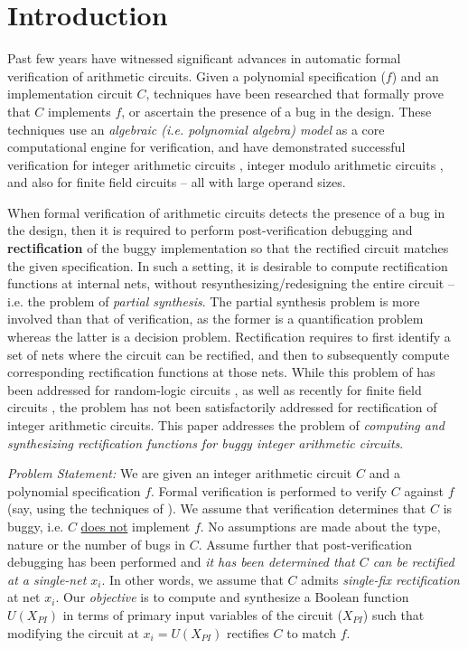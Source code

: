 \section{Introduction}

Past few years have witnessed significant advances in automatic
formal verification of arithmetic circuits. Given a polynomial
specification (\spec $f$) and an implementation circuit $C$, 
techniques have been researched that formally prove that $C$
implements $f$, or ascertain the 
presence of a bug in the design. These techniques use an {\it
  algebraic (i.e. polynomial algebra) model} as a core computational
engine for verification, and have demonstrated
successful verification for integer arithmetic circuits
\cite{kauffman2017} \cite{Armin2017ColumnWiseVO} \cite{PolyCleaner}
\cite{maciej:2016:1} \cite{Cunxi:TCAD_2018_9}, integer modulo
arithmetic circuits \cite{wienand:cav08}, and also for finite field
circuits \cite{lv:tcad2013} \cite{pruss:tcad} -- all with large
operand sizes.


When formal verification of arithmetic circuits detects the presence
of a bug in the design, then it is required to perform
post-verification debugging and {\bf rectification} of the buggy
implementation so that the rectified circuit matches the given
specification. In such a setting, it is desirable to compute
rectification functions at internal nets, without
resynthesizing/redesigning the entire circuit -- i.e. the problem of {\it
  partial synthesis}. The partial synthesis problem is more involved
than that of verification, as the former is a quantification problem
whereas the latter is a decision problem. Rectification 
requires to first identify a set of nets where the circuit can be
rectified, and then to subsequently compute corresponding
rectification functions at those nets.  While this problem of has been
addressed
for random-logic circuits \cite{Sadowska:DAC95} \cite{Huang:DAC2011}
\cite{fujita:2015} \cite{scholl:2}, as well as recently for finite
field circuits \cite{Utkarsh:vlsisoc18} \cite{utkarsh:fmcad18}, the
problem has not been satisfactorily addressed for rectification of
integer arithmetic circuits. This paper addresses the
problem of {\it computing and synthesizing rectification functions for
  buggy integer arithmetic circuits}. 

{\it Problem Statement:} We are given an integer arithmetic circuit
$C$ and a polynomial specification $f$. Formal verification is
performed to verify $C$ against $f$ (say, using the techniques of
\cite{Armin2017ColumnWiseVO}). We assume that verification determines
that $C$ is buggy, i.e. $C$ {\underline{does not}} implement $f$. No
assumptions are made about the type, nature or the number of bugs in
$C$. Assume further that post-verification debugging has been
performed and {\it it has been determined that $C$ can be rectified at
  a single-net $x_i$}. In other words, we assume that $C$ admits {\it
  single-fix rectification} at net $x_i$. Our {\it objective} is
to compute and synthesize a Boolean function $U(X_{PI})$ in
terms of primary input variables of the circuit ($X_{PI}$) such that
modifying the circuit at $x_i = U(X_{PI})$ rectifies $C$ to match
$f$. 

